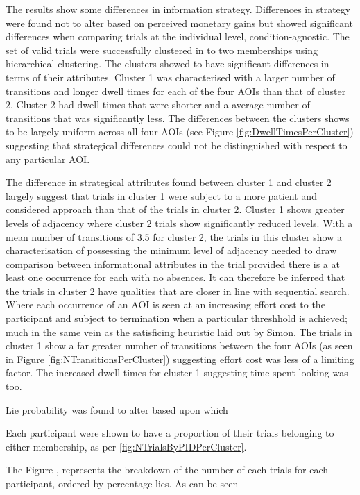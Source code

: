 \documentclass[man, floatsintext]{apa7}
\begin{document}
The results show some differences in information strategy. Differences in strategy were found not to alter based on perceived monetary gains but showed significant differences when comparing trials at the individual level, condition-agnostic. The set of valid trials were successfully clustered in to two memberships using hierarchical clustering. The clusters showed to have significant differences in terms of their attributes. Cluster 1 was characterised with a larger number of transitions and longer dwell times for each of the four AOIs than that of cluster 2. Cluster 2 had dwell times that were shorter and a average number of transitions that was significantly less. The differences between the clusters shows to be largely uniform across all four AOIs (see Figure \ref{fig:DwellTimesPerCluster}) suggesting that strategical differences could not be distinguished with respect to any particular AOI. 

The difference in strategical attributes found between cluster 1 and cluster 2 largely suggest that trials in cluster 1 were subject to a more patient and considered approach than that of the trials in cluster 2. Cluster 1 shows greater levels of adjacency where cluster 2 trials show significantly reduced levels. With a mean number of transitions of 3.5 for cluster 2, the trials in this cluster show a characterisation of possessing the minimum level of adjacency needed to draw comparison between informational attributes in the trial provided there is a at least one occurrence for each with no absences. It can therefore be inferred that the trials in cluster 2 have qualities that are closer in line with sequential search. Where each occurrence of an AOI is seen at an increasing effort cost to the participant and subject to termination when a particular threshhold is achieved; much in the same vein as the satisficing heuristic laid out by Simon. The trials in cluster 1 show a far greater number of transitions between the four AOIs (as seen in Figure \ref{fig:NTransitionsPerCluster}) suggesting effort cost was less of a limiting factor. The increased dwell times for cluster 1 suggesting time spent looking was too.

Lie probability was found to alter based upon which 




Each participant were shown to have a proportion of their trials belonging to either membership, as per \ref{fig:NTrialsByPIDPerCluster}. 


The Figure , represents the breakdown of the number of each trials for each participant, ordered by percentage lies. As can be seen
\end{document}
